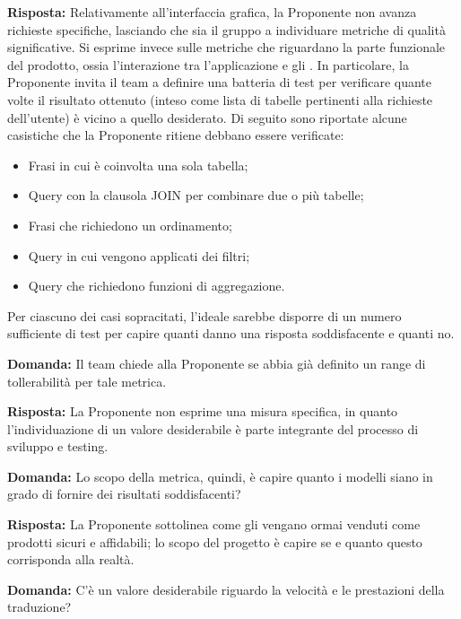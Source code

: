\par \textbf{Risposta:} Relativamente all'interfaccia grafica, la Proponente non avanza richieste specifiche, lasciando che sia il gruppo a individuare metriche di qualità significative. Si esprime invece sulle metriche che riguardano la parte funzionale del prodotto, ossia l'interazione tra l'applicazione e gli . In particolare, la Proponente invita il team a definire una batteria di test per verificare quante volte il risultato ottenuto (inteso come lista di tabelle pertinenti alla richieste dell'utente) è vicino a quello desiderato. Di seguito sono riportate alcune casistiche che la Proponente ritiene debbano essere verificate:
\begin{itemize}
	\item Frasi in cui è coinvolta una sola tabella;
	\item Query con la clausola JOIN per combinare due o più tabelle;
	\item Frasi che richiedono un ordinamento;
	\item Query in cui vengono applicati dei filtri;
	\item Query che richiedono funzioni di aggregazione.
\end{itemize}
Per ciascuno dei casi sopracitati, l'ideale sarebbe disporre di un numero sufficiente di test per capire quanti danno una risposta soddisfacente e quanti no.

\par \textbf{Domanda:} Il team chiede alla Proponente se abbia già definito un range di tollerabilità per tale metrica.

\par \textbf{Risposta:} La Proponente non esprime una misura specifica, in quanto l'individuazione di un valore desiderabile è parte integrante del processo di sviluppo e testing.

\par \textbf{Domanda:} Lo scopo della metrica, quindi, è capire quanto i modelli siano in grado di fornire dei risultati soddisfacenti?

\par \textbf{Risposta:} La Proponente sottolinea come gli  vengano ormai venduti come prodotti sicuri e affidabili; lo scopo del progetto è capire se e quanto questo corrisponda alla realtà.

\par \textbf{Domanda:} C'è un valore desiderabile riguardo la velocità e le prestazioni della traduzione?

